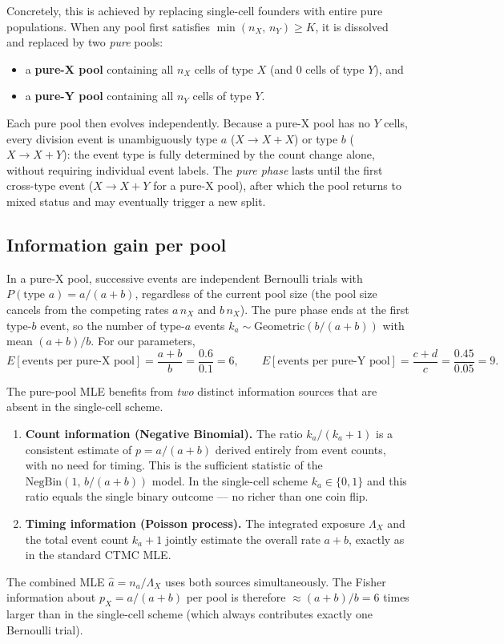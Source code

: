 \documentclass[12pt]{article}
\begin{document}
Concretely, this is achieved by replacing single-cell founders with entire
pure populations.  When any pool first satisfies $\min(n_X,\,n_Y) \ge K$, it
is dissolved and replaced by two \emph{pure} pools:
\begin{itemize}
  \item a \textbf{pure-X pool} containing all $n_X$ cells of type $X$ (and
        0 cells of type $Y$), and
  \item a \textbf{pure-Y pool} containing all $n_Y$ cells of type $Y$.
\end{itemize}
Each pure pool then evolves independently.  Because a pure-X pool has no
$Y$ cells, every division event is unambiguously type $a$ ($X\!\to\!X{+}X$)
or type $b$ ($X\!\to\!X{+}Y$): the event type is fully determined by
the count change alone, without requiring individual event labels.  The
\emph{pure phase} lasts until the first cross-type event
($X\!\to\!X{+}Y$ for a pure-X pool), after which the pool returns to mixed
status and may eventually trigger a new split.

\subsection{Information gain per pool}

In a pure-X pool, successive events are independent Bernoulli trials with
$P(\text{type }a) = a/(a+b)$, regardless of the current pool size (the pool
size cancels from the competing rates $a\,n_X$ and $b\,n_X$).  The pure phase
ends at the first type-$b$ event, so the number of type-$a$ events
$k_a \sim \mathrm{Geometric}(b/(a+b))$ with mean $(a+b)/b$.  For our
parameters,
\[
  E[\text{events per pure-X pool}] = \frac{a+b}{b} = \frac{0.6}{0.1} = 6,
  \qquad
  E[\text{events per pure-Y pool}] = \frac{c+d}{c} = \frac{0.45}{0.05} = 9.
\]

The pure-pool MLE benefits from \emph{two} distinct information sources that
are absent in the single-cell scheme.
\begin{enumerate}
  \item \textbf{Count information (Negative Binomial).}  The ratio
        $k_a / (k_a + 1)$ is a consistent estimate of $p = a/(a+b)$
        derived entirely from event counts, with no need for timing.
        This is the sufficient statistic of the
        $\mathrm{NegBin}(1,\,b/(a+b))$ model.  In the single-cell scheme
        $k_a \in \{0,1\}$ and this ratio equals the single binary outcome —
        no richer than one coin flip.
  \item \textbf{Timing information (Poisson process).}  The integrated
        exposure $\Lambda_X$ and the total event count $k_a + 1$ jointly
        estimate the overall rate $a + b$, exactly as in the standard CTMC
        MLE.
\end{enumerate}
The combined MLE $\hat a = n_a/\Lambda_X$ uses both sources simultaneously.
The Fisher information about $p_X = a/(a+b)$ per pool is therefore
$\approx (a+b)/b = 6$ times larger than in the single-cell scheme
(which always contributes exactly one Bernoulli trial).
\end{document}

